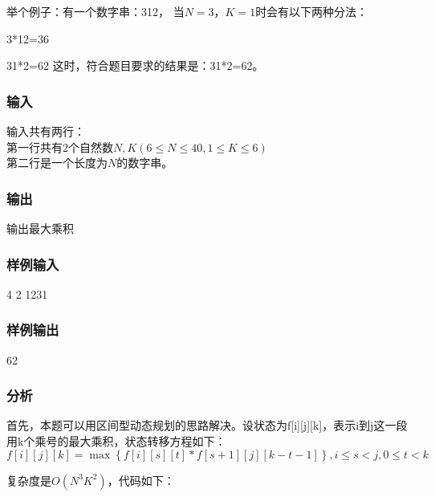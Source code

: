 举个例子：有一个数字串：312， 当$N=3$，$K=1$时会有以下两种分法：
\begindot
\item  3*12=36
\item  31*2=62
\myenddot
这时，符合题目要求的结果是：31*2=62。

\subsubsection{输入}
输入共有两行：\\
第一行共有2个自然数$N,K(6 \leq N \leq 40, 1 \leq K \leq 6)$\\
第二行是一个长度为$N$的数字串。

\subsubsection{输出}
输出最大乘积

\subsubsection{样例输入}
\begin{Code}
4 2
1231
\end{Code}

\subsubsection{样例输出}
\begin{Code}
62
\end{Code}

\subsubsection{分析}
首先，本题可以用区间型动态规划的思路解决。设状态为f[i][j][k]，表示i到j这一段用k个乘号的最大乘积，状态转移方程如下：
$$
f[i][j][k] = \max\left\{f[i][s][t] * f[s+1][j][k-t-1]\right\}, i \leq s < j , 0 \leq t < k
$$

复杂度是$O(N^3K^2)$，代码如下：

